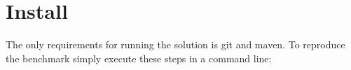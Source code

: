 
\section{Install}
\label{sec:Install}

The only requirements for running the solution is git and maven.
To reproduce the benchmark simply execute these steps in a command line:

